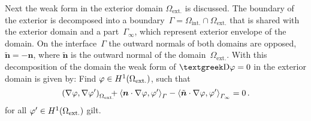 \begin{enumerate}
	Next the weak form in the exterior domain $\Omega_\mathrm{ext.}$ is discussed. The boundary of the exterior is decomposed into a boundary~$\varGamma=\varOmega_\mathrm{int.}\cap\varOmega_\mathrm{ext.}$ that is shared with the exterior domain and a part~$\varGamma_\infty$, which represent exterior envelope of the domain. On the interface~$\varGamma$ the outward normals of both domains are opposed, \ie $\tilde{\bm{n}}=-\bm{n}$, where $\tilde{\bm{n}}$ is the outward normal of the domain~$\varOmega_\mathrm{ext.}$. With this decomposition of the domain the weak form of $\laplace\varphi=0$ in the exterior domain is given by: Find $\varphi\in H^1(\Omega_\mathrm{ext.})$, such that
	\begin{equation}
		\label{eqn:WeakFormPhi}
		\left(\nabla\vp,\nabla\vp'\right)_{\mathrlap{\Omega_\mathrm{ext.}}\, \ \ \ }
		+\left\langle\bm{n}\cdot\nabla\vp,\vp'\right\rangle_{\varGamma}
		-\left\langle\tilde{\bm{n}}\cdot\nabla\vp,\vp'\right\rangle_{\varGamma_\infty}=0\,.
	\end{equation}
	for all $\varphi'\in H^1(\Omega_\mathrm{ext.})$ gilt.
	

\end{enumerate}
